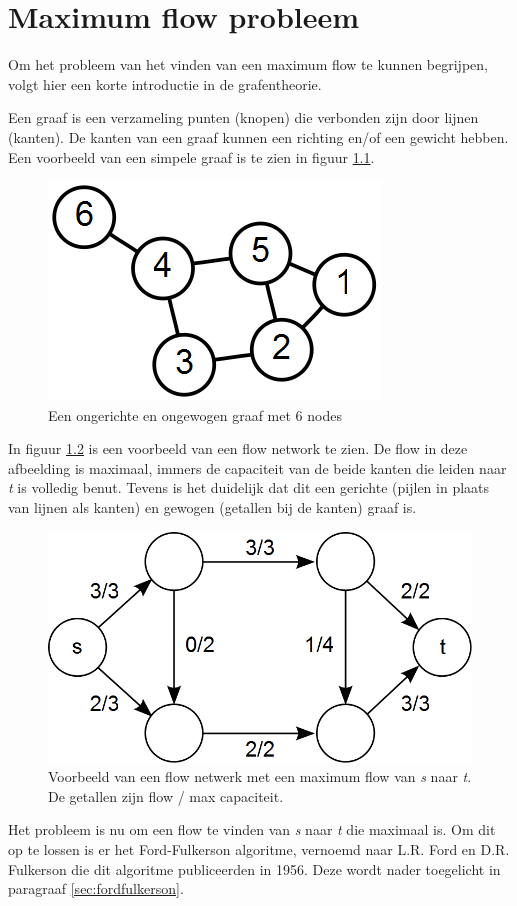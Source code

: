 \chapter{Maximum flow probleem}
\label{chap:maxFlowProblem}
Om het probleem van het vinden van een maximum flow te kunnen begrijpen, volgt hier een korte introductie in de grafentheorie.

Een graaf is een verzameling punten (knopen) die verbonden zijn door lijnen (kanten). De kanten van een graaf kunnen een richting en/of een gewicht hebben. Een voorbeeld van een simpele graaf is te zien in figuur \ref{fig:6ngraph}.

\begin{figure}[h]
	\includegraphics[width=0.5\linewidth]{maxflowproblem/6n-graph}
	\centering
	\caption{Een ongerichte en ongewogen graaf met 6 nodes}
	\label{fig:6ngraph}
\end{figure}

In figuur \ref{fig:flownetwork} is een voorbeeld van een flow network te zien. De flow in deze afbeelding is maximaal, immers de capaciteit van de beide kanten die leiden naar \textit{t} is volledig benut. Tevens is het duidelijk dat dit een gerichte (pijlen in plaats van lijnen als kanten) en gewogen (getallen bij de kanten) graaf is.

\begin{figure}[h]
\includegraphics[width=0.5\linewidth]{maxflowproblem/max_flow}%
\centering
\caption{Voorbeeld van een flow netwerk met een maximum flow van \textit{s} naar \textit{t}. De getallen zijn flow / max capaciteit.}%
\label{fig:flownetwork}%
\end{figure}

Het probleem is nu om een flow te vinden van \textit{s} naar \textit{t} die maximaal is. Om dit op te lossen is er het Ford-Fulkerson algoritme, vernoemd naar L.R. Ford en D.R. Fulkerson die dit algoritme publiceerden in 1956. Deze wordt nader toegelicht in paragraaf \ref{sec:fordfulkerson}.

